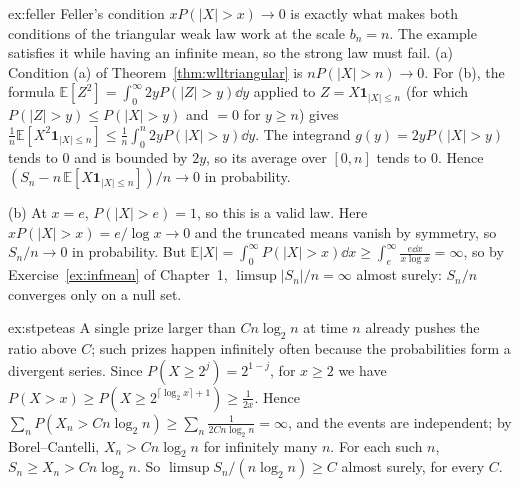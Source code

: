 \begin{solution}{ex:feller}
\idea Feller's condition $xP(|X|>x)\to0$ is exactly what makes both conditions of the triangular weak law work at the scale $b_n=n$. The example
satisfies it while having an infinite mean, so the strong law must fail.
\writeup (a) Condition (a) of Theorem~\ref{thm:wlltriangular} is $nP(|X|>n)\to0$. For (b), the formula $\mathbb E[Z^2]=\int_0^\infty2yP(|Z|>y)\dd y$ applied to
$Z=X\mathbf 1_{|X|\le n}$ (for which $P(|Z|>y)\le P(|X|>y)$ and $=0$ for $y\ge n$) gives $\frac1n\mathbb E[X^2\mathbf 1_{|X|\le n}]\le\frac1n\int_0^n2yP(|X|>y)\dd y$.
The integrand $g(y)=2yP(|X|>y)$ tends to $0$ and is bounded by $2y$, so its average over $[0,n]$ tends to $0$. Hence $(S_n-n\,\mathbb E[X\mathbf 1_{|X|\le n}])/n\to0$
in probability.

(b) At $x=e$, $P(|X|>e)=1$, so this is a valid law. Here $xP(|X|>x)=e/\log x\to0$ and the truncated means vanish by symmetry, so $S_n/n\to0$ in probability.
But $\mathbb E|X|=\int_0^\infty P(|X|>x)\dd x\ge\int_e^\infty\frac{e\dd x}{x\log x}=\infty$, so by Exercise~\ref{ex:infmean} of Chapter~1, $\limsup|S_n|/n=\infty$
almost surely: $S_n/n$ converges only on a null set.
\end{solution}

\begin{solution}{ex:stpeteas}
\idea A single prize larger than $Cn\log_2n$ at time $n$ already pushes the ratio above $C$; such prizes happen infinitely often because the
probabilities form a divergent series.
\writeup Since $P(X\ge2^j)=2^{1-j}$, for $x\ge2$ we have $P(X>x)\ge P(X\ge2^{\lceil\log_2x\rceil+1})\ge\frac1{2x}$. Hence
$\sum_nP(X_n>Cn\log_2n)\ge\sum_n\frac1{2Cn\log_2n}=\infty$, and the events are independent; by Borel--Cantelli, $X_n>Cn\log_2n$ for infinitely many $n$. For each
such $n$, $S_n\ge X_n>Cn\log_2n$. So $\limsup S_n/(n\log_2n)\ge C$ almost surely, for every $C$.
\end{solution}

